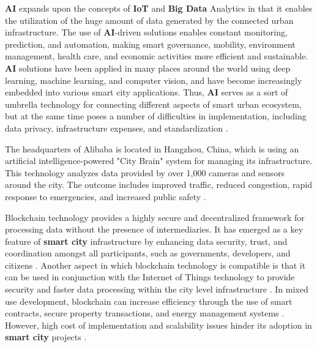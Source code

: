\documentclass[pdflatex,sn-mathphys-num]{sn-jnl}%
\theoremstyle{thmstyleone}%
\theoremstyle{thmstyletwo}%
\theoremstyle{thmstylethree}%
\begin{document}
\textbf{AI} expands upon the concepts of \textbf{IoT} and \textbf{Big Data} Analytics in that it enables the utilization of the huge amount of data generated by the connected urban infrastructure. The use of \textbf{AI}-driven solutions enables constant monitoring, prediction, and automation, making smart governance, mobility, environment management, health care, and economic activities more efficient and sustainable. \textbf{AI} solutions have been applied in many places around the world using deep learning, machine learning, and computer vision, and have become increasingly embedded into various smart city applications. Thus, \textbf{AI} serves as a sort of umbrella technology for connecting different aspects of smart urban ecosystem, but at the same time poses a number of difficulties in implementation, including data privacy, infrastructure expenses, and standardization \cite{r6}.

The headquarters of Alibaba is located in Hangzhou, China, which is using an artificial intelligence-powered "City Brain" system for managing its infrastructure. This technology analyzes data provided by over 1,000 cameras and sensors around the city. The outcome includes improved traffic, reduced congestion, rapid response to emergencies, and increased public safety \cite{r71}.

Blockchain technology provides a highly secure and decentralized framework for processing data without the presence of intermediaries. It has emerged as a key feature of \textbf{smart city} infrastructure by enhancing data security, trust, and coordination amongst all participants, such as governments, developers, and citizens \cite{r92,r93}. Another aspect in which blockchain technology is compatible is that it can be used in conjunction with the Internet of Things technology to provide security and faster data processing within the city level infrastructure \cite{r94}. In mixed use development, blockchain can increase efficiency through the use of smart contracts, secure property transactions, and energy management systems \cite{r95,r97}. However, high cost of implementation and scalability issues hinder its adoption in \textbf{smart city} projects \cite{r97,r96}.
\end{document}
